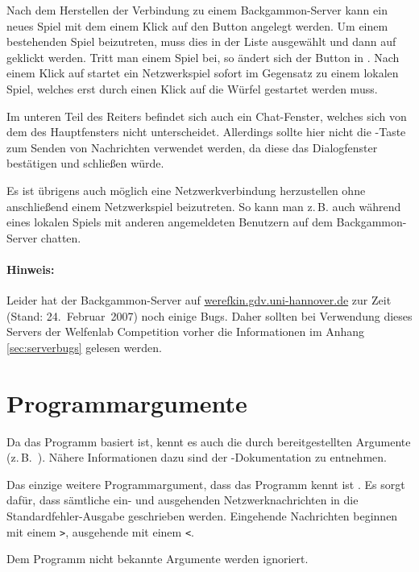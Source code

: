 Nach dem Herstellen der Verbindung zu einem Backgammon-Server kann ein neues Spiel mit dem einem Klick auf den Button  angelegt werden. Um einem bestehenden Spiel beizutreten, muss dies in der Liste ausgewählt und dann auf  geklickt werden. Tritt man einem Spiel bei, so ändert sich der Button  in . Nach einem Klick auf  startet ein Netzwerkspiel sofort im Gegensatz zu einem lokalen Spiel, welches erst durch einen Klick auf die Würfel gestartet werden muss.

Im unteren Teil des Reiters  befindet sich auch ein Chat-Fenster, welches sich von dem des Hauptfensters nicht unterscheidet. Allerdings sollte hier nicht die -Taste zum Senden von Nachrichten verwendet werden, da diese das Dialogfenster bestätigen und schließen würde.

Es ist übrigens auch möglich eine Netzwerkverbindung herzustellen ohne anschließend einem Netzwerkspiel beizutreten. So kann man z.\,B. auch während eines lokalen Spiels mit anderen angemeldeten Benutzern auf dem Backgammon-Server chatten.

\paragraph*{Hinweis:} Leider hat der Backgammon-Server auf \url{werefkin.gdv.uni-hannover.de} zur Zeit (Stand: 24.~Februar~2007) noch einige Bugs. Daher sollten bei Verwendung dieses Servers der Welfenlab Competition vorher die Informationen im Anhang \ref{sec:serverbugs} gelesen werden.

\section{Programmargumente}
Da das Programm  basiert ist, kennt es auch die durch  bereitgestellten Argumente (z.\,B.~). Nähere Informationen dazu sind der -Dokumentation zu entnehmen.

Das einzige weitere Programmargument, dass das Programm kennt ist . Es sorgt dafür, dass sämtliche ein- und ausgehenden Netzwerknachrichten in die Standardfehler-Ausgabe geschrieben werden. Eingehende Nachrichten beginnen mit einem \glq\lstinline$>$\grq, ausgehende mit einem \glq\lstinline$<$\grq.

Dem Programm nicht bekannte Argumente werden ignoriert.

